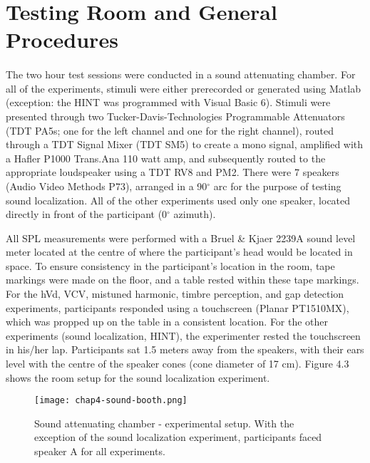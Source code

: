 \section{Testing Room and General Procedures}
\paragraph{}The two hour test sessions were conducted in a sound attenuating chamber.  For all of the experiments, stimuli were either prerecorded or generated using Matlab (exception: the HINT was programmed with Visual Basic 6).  Stimuli were presented through two Tucker-Davis-Technologies Programmable Attenuators (TDT PA5s; one for the left channel and one for the right channel), routed through a TDT Signal Mixer (TDT SM5) to create a mono signal, amplified with a Hafler P1000 Trans.Ana 110 watt amp, and subsequently routed to the appropriate loudspeaker using a TDT RV8 and PM2.  There were 7 speakers (Audio Video Methods P73), arranged in a 90$^\circ$ arc for the purpose of testing sound localization.  All of the other experiments used only one speaker, located directly in front of the participant (0$^\circ$ azimuth).

All SPL measurements were performed with a Bruel \& Kjaer 2239A sound level meter located at the centre of where the participant's head would be located in space.  To ensure consistency in the participant's location in the room, tape markings were made on the floor, and a table rested within these tape markings.  For the hVd, VCV, mistuned harmonic, timbre perception, and gap detection experiments, participants responded using a touchscreen (Planar PT1510MX), which was propped up on the table in a consistent location.  For the other experiments (sound localization, HINT), the experimenter rested the touchscreen in his/her lap.  Participants sat 1.5 meters away from the speakers, with their ears level with the centre of the speaker cones (cone diameter of 17 cm).  Figure 4.3 shows the room setup for the sound localization experiment.

\begin{figure}[htp]
\begin{center}
\texttt{[image: chap4-sound-booth.png]} \\
\caption[Sound attenuating chamber - experimental setup]{Sound attenuating chamber - experimental setup.  With the exception of the sound localization experiment, participants faced speaker A for all experiments.}
\label{ch4-sound-booth}
\end{center}
\end{figure}

